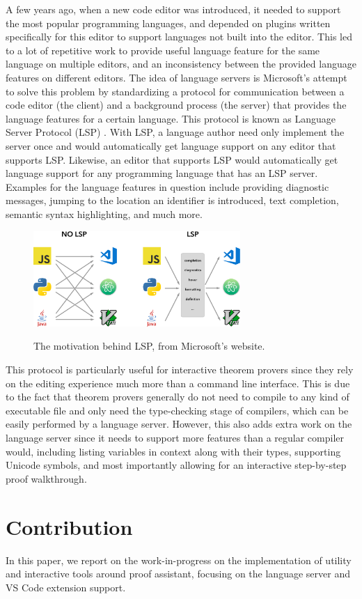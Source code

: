 A few years ago, when a new code editor was introduced,
it needed to support the most popular programming languages,
and depended on plugins written specifically for this editor to support languages not built into the editor.
This led to a lot of repetitive work to provide useful language feature for the same language on multiple editors,
and an inconsistency between the provided language features on different editors.
The idea of language servers is Microsoft's attempt to solve this problem by standardizing a protocol for communication between a code editor (the client) and a background process (the server) that provides the language features for a certain language. This protocol is known as Language Server Protocol (LSP) \cite{Gunasinghe2022}. With LSP, a language author need only implement the server once and would automatically get language support on any editor that supports LSP. Likewise, an editor that supports LSP would automatically get language support for any programming language that has an LSP server. Examples for the language features in question include providing diagnostic messages, jumping to the location an identifier is introduced, text completion, semantic syntax highlighting, and much more.

\begin{figure}
  \centering
  \includegraphics[width=0.7\textwidth]{figs/LSP-MxN.png}
  \label{figure:lsp}
  \caption{
    The motivation behind LSP, from Microsoft's website.
    \protect\footnotemark
  }
\end{figure}

This protocol is particularly useful for interactive theorem provers since
they rely on the editing experience much more than a command line interface.
This is due to the fact that theorem provers generally do not need to compile
to any kind of executable file and only need the type-checking stage of compilers,
which can be easily performed by a language server. However, this also adds extra work
on the language server since it needs to support more features than a regular compiler would,
including listing variables in context along with their types, supporting Unicode symbols,
and most importantly allowing for an interactive step-by-step proof walkthrough.

\section{Contribution}

In this paper, we report on the work-in-progress on the implementation of
utility and interactive tools around \Rzk{} proof assistant, focusing on
the language server and VS Code extension support.
